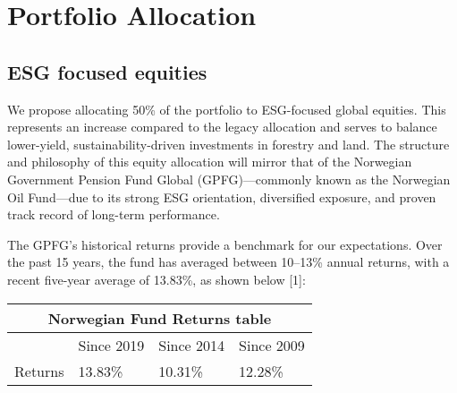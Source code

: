





\section*{Portfolio Allocation}
\subsection*{ESG focused equities}
\par We propose allocating 50\% of the portfolio to ESG-focused global equities. This represents an increase compared to the legacy allocation and serves to balance lower-yield, sustainability-driven investments in forestry and land. The structure and philosophy of this equity allocation will mirror that of the Norwegian Government Pension Fund Global (GPFG)—commonly known as the Norwegian Oil Fund—due to its strong ESG orientation, diversified exposure, and proven track record of long-term performance.
\par The GPFG’s historical returns provide a benchmark for our expectations. Over the past 15 years, the fund has averaged between 10–13\% annual returns, with a recent five-year average of 13.83\%, as shown below [1]:\\
\bigskip
\begin{center}
    

\begin{tabular}{ |p{3cm}||p{3cm}|p{3cm}|p{3cm}|  }
 \hline
 \multicolumn{4}{|c|}{Norwegian Fund Returns table} \\
 \hline
  & Since 2019 & Since 2014 & Since 2009\\
 \hline
 Returns   & 13.83\%    &10.31\%&  12.28\%\\
 
 \hline
\end{tabular}
\end{center}
\bigskip

